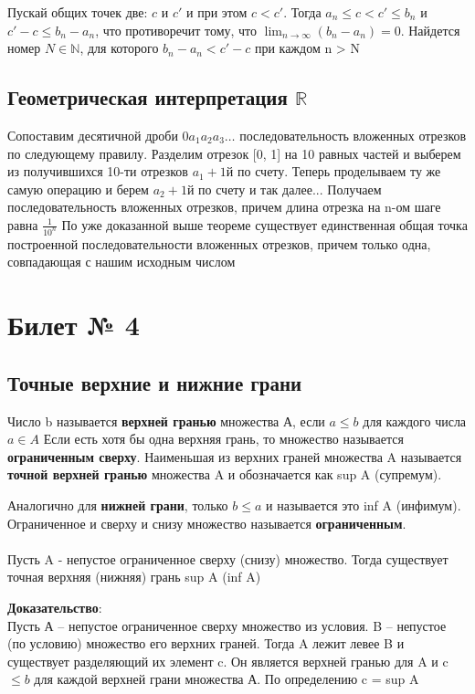 \documentclass[a4paper,12pt]{article}
\begin{document}
Пускай общих точек две: $c$ и $c'$ и при этом $c < c'$. Тогда $a_n \leq c < c' \leq b_n$ и $ c' - c \leq b_n - a_n$, что противоречит тому, что  $\lim_{n \rightarrow \infty}(b_n - a_n) = 0 $. Найдется номер $N \in \mathbb{N}$, для которого $b_n - a_n < c'- c$ при каждом n > N
\subsection*{Геометрическая интерпретация $\mathbb{R}$}
Сопоставим десятичной дроби $0a_1a_2a_3\ldots$ последовательность вложенных отрезков по следующему правилу. Разделим отрезок [0, 1] на 10 равных частей и выберем из получившихся 10-ти отрезков $a_1 + 1$й по счету.  Теперь проделываем ту же самую операцию и берем $a_2 + 1$й по счету и так далее... Получаем последовательность вложенных отрезков, причем длина отрезка на n-ом шаге равна $\frac{1}{10^n}$ По уже доказанной выше теореме существует единственная общая точка построенной последовательности вложенных отрезков, причем только одна, совпадающая с нашим исходным числом

\newpage
\section*{Билет № 4}
\subsection*{Точные верхние и нижние грани}
Число b называется \textbf{верхней гранью} множества А, если $a \leq b$ для каждого числа $a \in A$ Если есть хотя бы одна верхняя грань, то множество называется \textbf{ограниченным сверху}. Наименьшая из верхних граней множества A называется \textbf{точной верхней гранью} множества A и обозначается как sup A (супремум).

Аналогично для \textbf{нижней грани}, только $b \leq a$ и 
называется это inf A (инфимум).
\\
Ограниченное и сверху и снизу множество называется \textbf{ограниченным}.
\\\\
Пусть A - непустое ограниченное сверху (снизу) множество. Тогда существует точная верхняя (нижняя) грань sup A (inf A)

\textbf{Доказательство}:
\\
Пусть А -- непустое ограниченное сверху множество из условия. B -- непустое (по условию) множество его верхних граней.  Тогда A лежит левее B и существует разделяющий их элемент c. Он является верхней гранью для A и c $\leq b$ для каждой верхней грани множества А.  По определению c = sup A
\end{document}
